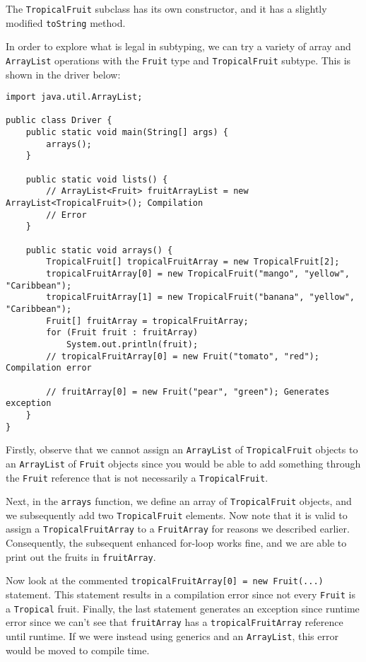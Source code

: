 The \verb!TropicalFruit! subclass has its own constructor, and it has a slightly modified \verb!toString! method. 

In order to explore what is legal in subtyping, we can try a variety of array and \verb!ArrayList! operations with the \verb!Fruit! type and \verb!TropicalFruit! subtype. This is shown in the driver below:

\begin{lstlisting}
import java.util.ArrayList;

public class Driver {
	public static void main(String[] args) {
		arrays();
	}

	public static void lists() {
		// ArrayList<Fruit> fruitArrayList = new ArrayList<TropicalFruit>(); Compilation
		// Error
	}

	public static void arrays() {
		TropicalFruit[] tropicalFruitArray = new TropicalFruit[2];
		tropicalFruitArray[0] = new TropicalFruit("mango", "yellow", "Caribbean");
		tropicalFruitArray[1] = new TropicalFruit("banana", "yellow", "Caribbean");
		Fruit[] fruitArray = tropicalFruitArray;
		for (Fruit fruit : fruitArray)
			System.out.println(fruit);
		// tropicalFruitArray[0] = new Fruit("tomato", "red"); Compilation error

		// fruitArray[0] = new Fruit("pear", "green"); Generates exception
	}
}
\end{lstlisting}


Firstly, observe that we cannot assign an \verb!ArrayList! of \verb!TropicalFruit! objects to an \verb!ArrayList! of \verb!Fruit! objects since you would be able to add something through the \verb!Fruit! reference that is not necessarily a \verb!TropicalFruit!. 
 
Next, in the \verb!arrays! function, we define an array of \verb!TropicalFruit! objects, and we subsequently add two \verb!TropicalFruit! elements. Now note that it is valid to assign a \verb!TropicalFruitArray! to a \verb!FruitArray! for reasons we described earlier. Consequently, the subsequent enhanced for-loop works fine, and we are able to print out the fruits in \verb!fruitArray!. 

Now look at the commented \verb!tropicalFruitArray[0] = new Fruit(...)! statement. This statement results in a compilation error since not every \verb!Fruit! is a \verb!Tropical! fruit. Finally, the last statement generates an exception since runtime error since we can't see that \verb!fruitArray! has a \verb!tropicalFruitArray! reference until runtime. If we were instead using generics and an \verb!ArrayList!, this error would be moved to compile time. 



